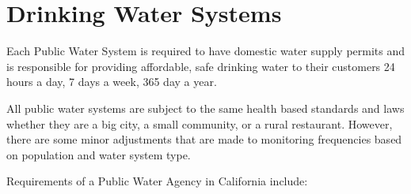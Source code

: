 
\chapter{Drinking Water Systems}

\item Each Public Water System is required to have domestic water supply permits and is responsible for providing affordable, safe drinking water to their customers 24 hours a day, 7 days a week, 365 day a year.

\item All public water systems are subject to the same health based standards and laws whether they are a big city, a small community, or a rural restaurant. However, there are some minor adjustments that are made to monitoring frequencies based on population and water system type.

\item Requirements of a Public Water Agency in California include:

